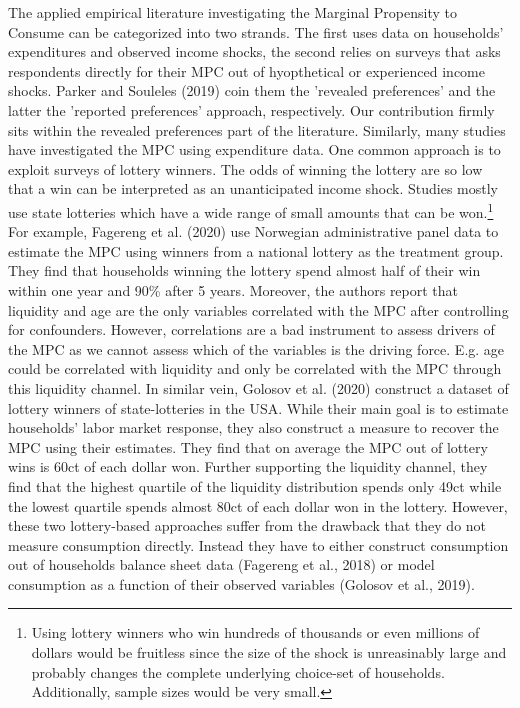 The applied empirical literature investigating the Marginal Propensity to Consume can be categorized into two strands. The first uses data on households' expenditures and observed income shocks, the second relies on surveys that asks respondents directly for their MPC out of hyopthetical or experienced income shocks. Parker and Souleles (2019) coin them the 'revealed preferences' and the latter the 'reported preferences' approach, respectively. Our contribution firmly sits within the revealed preferences part of the literature. Similarly, many studies have investigated the MPC using expenditure data. One common approach is to exploit surveys of lottery winners. The odds of winning the lottery are so low that a win can be interpreted as an unanticipated income shock. Studies mostly use state lotteries which have a wide range of small amounts that can be won.\footnote{Using lottery winners who win hundreds of thousands or even millions of dollars would be fruitless since the size of the shock is unreasinably large and probably changes the complete underlying choice-set of households. Additionally, sample sizes would be very small.} For example, Fagereng et al. (2020) use Norwegian administrative panel data to estimate the MPC using winners from a national lottery as the treatment group. They find that households winning the lottery spend almost half of their win within one year and 90\% after 5 years. Moreover, the authors report that liquidity and age are the only variables correlated with the MPC after controlling for confounders. However, correlations are a bad instrument to assess drivers of the MPC as we cannot assess which of the variables is the driving force. E.g. age could be correlated with liquidity and only be correlated with the MPC through this liquidity channel. In similar vein, Golosov et al. (2020) construct a dataset of lottery winners of state-lotteries in the USA. While their main goal is to estimate households' labor market response, they also construct a measure to recover the MPC using their estimates. They find that on average the MPC out of lottery wins is 60ct of each dollar won. Further supporting the liquidity channel, they find that the highest quartile of the liquidity distribution spends only 49ct while the lowest quartile spends almost 80ct of each dollar won in the lottery. However, these two lottery-based approaches suffer from the drawback that they do not measure consumption directly. Instead they have to either construct consumption out of households balance sheet data (Fagereng et al., 2018) or model consumption as a function of their observed variables (Golosov et al., 2019). \\
